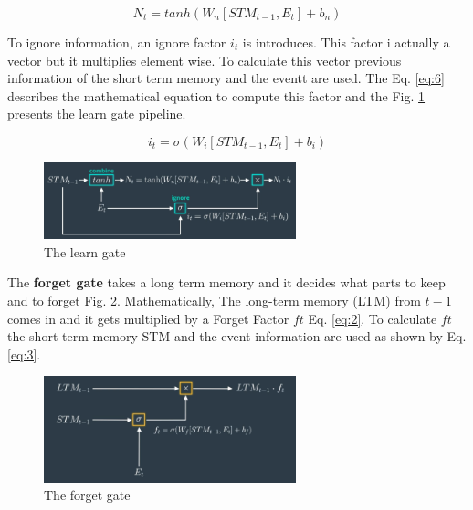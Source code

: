 \documentclass{article}
\begin{document}
\begin{equation}
N_t =  tanh(W_n[STM_{t-1}, E_t] + b_n)
\label{eq:5}
\end{equation}

To ignore information, an ignore factor \(i_t\) is introduces. This factor i actually a vector but it multiplies element wise. To calculate this vector previous information of the short term memory and the eventt are used. The Eq. \eqref{eq:6} describes the mathematical equation to compute this factor and the Fig. \ref{fig:f13} presents the learn gate pipeline.

\begin{equation}
i_t =  \sigma(W_i[STM_{t-1}, E_t] + b_i)
\label{eq:6}
\end{equation}

\begin{figure}[ht]
    \centering
    \includegraphics[width=0.65\textwidth,height=0.65\textheight,keepaspectratio]{images/learn_gate.png}
    \captionsetup{justification=centering}
    \caption{The learn gate}
    \label{fig:f13}
\end{figure}



The \textbf{forget gate} takes a long term memory and it decides what parts to keep and to forget Fig. \ref{fig:f11}. Mathematically, The long-term memory (LTM) from \(t-1\) comes in and it gets multiplied by a Forget Factor \(ft\) Eq. \eqref{eq:2}. To calculate \(ft\) the short term memory STM and the event information are used as shown by Eq. \eqref{eq:3}.

\begin{figure}[ht]
    \centering
    \includegraphics[width=0.65\textwidth,height=0.65\textheight,keepaspectratio]{images/forget_gate.png}
    \captionsetup{justification=centering}
    \caption{The forget gate}
    \label{fig:f11}
\end{figure}
\end{document}
